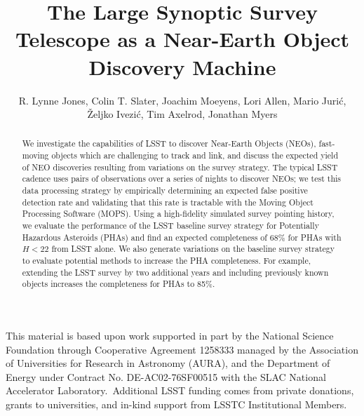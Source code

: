 \documentclass[12pt,preprint]{aastex}
\begin{document}
\title{The Large Synoptic Survey Telescope as a Near-Earth Object Discovery Machine}

\author{R. Lynne Jones,
Colin T. Slater,
Joachim Moeyens,
Lori Allen,
Mario Juri\'{c},
\v{Z}eljko Ivezi\'{c},
Tim Axelrod,
Jonathan Myers
}

\begin{abstract}
We investigate the capabilities of LSST to discover Near-Earth Objects (NEOs), fast-moving objects
which are challenging to track and link, and discuss the expected yield of NEO discoveries
resulting from variations on the survey strategy. The typical LSST cadence uses pairs of observations
over a series of nights to discover NEOs; we test this data processing strategy by empirically determining
an expected false positive detection rate and validating that this rate is tractable with the Moving Object
Processing Software (MOPS). Using a high-fidelity simulated survey pointing history, we evaluate the
performance of the LSST baseline survey strategy for Potentially Hazardous Asteroids (PHAs) and
find an expected completeness of 68\% for PHAs with $H<22$ from LSST alone. We also generate variations
on the baseline survey strategy to evaluate potential methods to increase the PHA completeness. For example,
extending the LSST survey by two additional years and including previously known objects increases the
completeness for PHAs to 85\%.
\end{abstract}














\acknowledgements
This material is based upon work supported in part by the National Science
Foundation through Cooperative Agreement 1258333 managed by the Association of
Universities for Research in Astronomy (AURA), and the Department of Energy
under Contract No. DE-AC02-76SF00515 with the SLAC National Accelerator
Laboratory. Additional LSST funding comes from private donations, grants to
universities, and in-kind support from LSSTC Institutional Members.

\appendix




\end{document}
